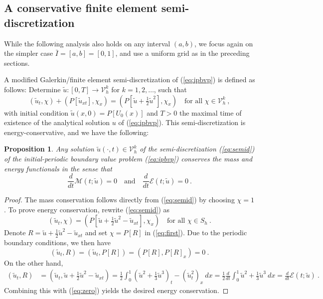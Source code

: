 \documentclass{amsart}
\newcommand{\tu}{\tilde{u}}
\newtheorem{proposition}{Proposition}[section]
\begin{document}
\subsection{A conservative finite element semi-discretization}

While the following analysis also holds on any interval $(a,b)$, we focus again on the simpler case $\bar{I}=[a,b]=[0,1]$, and use a uniform grid as in the preceding sections. 

A modified Galerkin/finite element semi-discretization of (\ref{eq:ipbvp}) is defined as follows: Determine $\tu:[0,T]\to \mathcal{V}_h^k$ for $k=1,2,\dots$,  such that 
\begin{equation}\label{eq:semid}
(\tu_t,\chi)+(P[\tu_{xt}],\chi_x)=(P[\tu+\tfrac{1}{2}\tu^2],\chi_x)\quad \text{for all $\chi\in \mathcal{V}_h^k$}\ ,
\end{equation}
with initial condition $\tilde{u}(x,0)=P[U_0(x)]$ and $T>0$ the maximal time of existence of the analytical solution $u$ of (\ref{eq:ipbvp}). This semi-discretization is energy-conserva\-tive, and we have the following:
%
\begin{proposition}\label{prop:conserv}
 Any solution $\tu(\cdot,t)\in \mathcal{V}_h^k$ of the semi-discretization (\ref{eq:semid}) of the initial-periodic boundary value problem (\ref{eq:ipbvp}) conserves the mass and energy functionals in the sense that
 $$\frac{d}{dt}\mathcal{M}(t;\tu)=0\quad \text{and}\quad \frac{d}{dt}\mathcal{E}(t;\tu)=0\ .$$
\end{proposition}
%
\begin{proof}
The mass conservation follows directly from (\ref{eq:semid}) by choosing $\chi=1$.
%
To prove energy conservation, rewrite (\ref{eq:semid}) as
\begin{equation}\label{eq:first}
(\tu_t,\chi)=(P[\tu+\tfrac{1}{2}\tu^2-\tu_{xt}],\chi_x)\quad \text{for all $\chi\in S_h$}\ . 
\end{equation}
Denote $R=\tu+\tfrac{1}{2}\tu^2-\tu_{xt}$ and set $\chi=P[R]$ in (\ref{eq:first}). Due to the periodic boundary conditions, we then have
\begin{equation}\label{eq:zero}
(\tu_t,R) = (\tu_t,P[R])=(P[R],P[R]_x) =0\ .
\end{equation}
%
On the other hand,
$$
\begin{aligned}
(\tu_t,R) &= (\tu_t,\tu+\tfrac{1}{2} \tu^2-\tu_{xt})=\tfrac{1}{2}\int_0^1(\tu^2+\tfrac{1}{3}\tu^3)_t-(\tu_t^2)_x~dx=\tfrac{1}{2}\frac{d}{dt}\int_0^1 \tu^2+\tfrac{1}{3}\tu^3~dx=\frac{d}{dt}\mathcal{E}(t;\tu)\ .
\end{aligned}
$$
Combining this with (\ref{eq:zero}) yields the desired energy conservation.
\end{proof}
\end{document}
